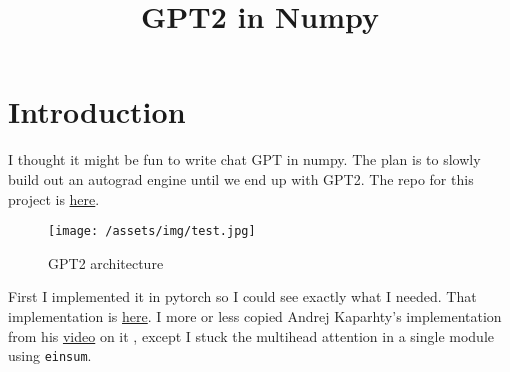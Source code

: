 \documentclass[11pt]{article}
\title{GPT2 in Numpy}
\begin{document}
\maketitle
\section{Introduction}
I thought it might be fun to write chat GPT in numpy. 
The plan is to slowly build out an autograd engine until we end up with GPT2.
The repo for this project is \href{https://github.com/sammy-snipes/numpy-GPT2}{here}. 

\begin{figure}[H]
  \begin{center}
    \texttt{[image: /assets/img/test.jpg]}
  \end{center}
  \caption{GPT2 architecture}\label{fig:}
\end{figure}

First I implemented it in pytorch so I could see exactly what I needed. That implementation is 
\href{https://github.com/sammy-snipes/numpy-GPT2/blob/main/numpyGPT/pytorch_reference.py}{here}.
I more or less copied Andrej Kaparhty's implementation from his 
\href{https://github.com/karpathy/ng-video-lecture}{video} on it
, except I stuck the multihead attention in a single 
module using \texttt{einsum}. 
\end{document}
